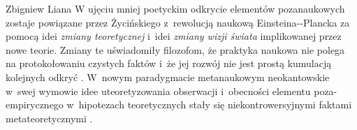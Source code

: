 \begin{artplenv}{Zbigniew Liana}
W ujęciu mniej poetyckim odkrycie elementów pozanaukowych zostaje powiązane przez Życińskiego z~rewolucją naukową
Einsteina-\mbox{-Plancka} %
za pomocą idei \textit{zmiany teoretycznej} i~idei \textit{zmiany wizji świata} implikowanej przez
nowe teorie. Zmiany te uświadomiły filozofom, że praktyka naukowa nie polega na protokołowaniu czystych faktów
\parencites[s.~34]{zycinski_structure_1988}[s.~59]{zycinski_struktura_2013}
i~że jej rozwój nie jest prostą kumulacją
kolejnych odkryć
\parencite[zob.][s.~229]{zycinski_elementy_1996}.
W~nowym paradygmacie metanaukowym
neokantowskie w~swej wymowie idee uteoretyzowania obserwacji i~obecności elementu poza-empirycznego w~hipotezach
teoretycznych stały się niekontrowersyjnymi faktami metateoretycznymi
\parencite[por.][s.~127]{zycinski_elementy_1996}.


\end{artplenv}
